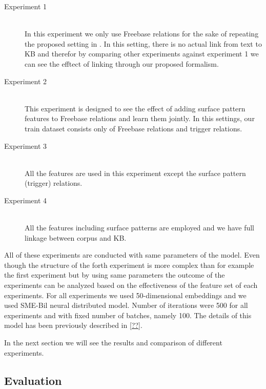 \begin {description}
\item[Experiment 1] \hfil \\
In this experiment we only use Freebase relations for the sake of repeating the
proposed setting in \cite{Bordes2011}. In this setting, there is no actual link
from text to KB and therefor by comparing other experiments against experiment 1
we can see the efftect of linking through our proposed formalism.
\item[Experiment 2] \hfill \\
This experiment is designed to see the effect of adding surface pattern features
to Freebase relations and learn them jointly. In this settings, our train
dataset consists only of Freebase relations and trigger relations.
\item[Experiment 3] \hfill \\
All the features are used in this experiment except
the surface pattern (trigger) relations. 
\item[Experiment 4] \hfill \\
All the features including surface patterns are employed and we have full
linkage between corpus and KB. 
\end{description}

All of these experiments are conducted with same parameters of the model. Even
though the structure of the forth experiment is more complex than for example
the first experiment but by using same parameters the outcome of the experiments
can be analyzed based on the effectiveness of the feature set of each
experiments. For all experiments we used 50-dimensional embeddings and we used
SME-Bil neural distributed model. Number of iterations were 500 for all
experiments and with fixed number of batches, namely 100. The details of this
model has been previously described in \autoref{??}.

In the next section we will see the results and comparison of different
experiments.


\subsection{Evaluation}
\label{ssec:textkb-exp-exp}

